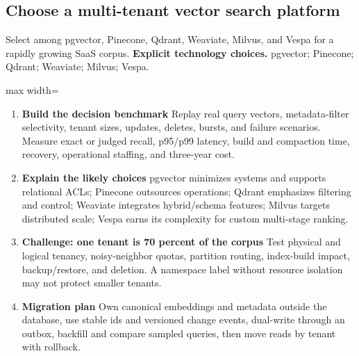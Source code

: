 \subsection{Choose a multi-tenant vector search platform}
Select among pgvector, Pinecone, Qdrant, Weaviate, Milvus, and Vespa for a rapidly growing SaaS corpus.
\textbf{Explicit technology choices.} pgvector; Pinecone; Qdrant; Weaviate; Milvus; Vespa.
\begin{center}\begin{adjustbox}{max width=\linewidth}\end{adjustbox}\end{center}
\begin{enumerate}
\item \textbf{Build the decision benchmark} Replay real query vectors, metadata-filter selectivity, tenant sizes, updates, deletes, bursts, and failure scenarios. Measure exact or judged recall, p95/p99 latency, build and compaction time, recovery, operational staffing, and three-year cost.
\item \textbf{Explain the likely choices} pgvector minimizes systems and supports relational ACLs; Pinecone outsources operations; Qdrant emphasizes filtering and control; Weaviate integrates hybrid/schema features; Milvus targets distributed scale; Vespa earns its complexity for custom multi-stage ranking.
\item \textbf{Challenge: one tenant is 70 percent of the corpus} Test physical and logical tenancy, noisy-neighbor quotas, partition routing, index-build impact, backup/restore, and deletion. A namespace label without resource isolation may not protect smaller tenants.
\item \textbf{Migration plan} Own canonical embeddings and metadata outside the database, use stable ids and versioned change events, dual-write through an outbox, backfill and compare sampled queries, then move reads by tenant with rollback.
\end{enumerate}
